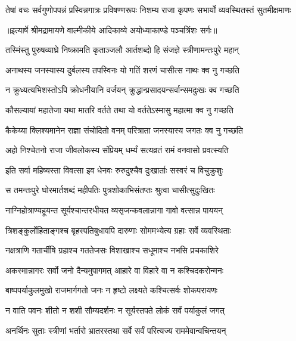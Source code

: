 \fourlineindentedshloka
{तेषां वचः सर्वगुणोपपन्नं}
{ प्रस्विन्नगात्रः प्रविषण्णरूपः}
{निशम्य राजा कृपणः सभार्यो}
{ व्यवस्थितस्तं सुतमीक्षमाणः} %


{॥इत्यार्षे श्रीमद्रामायणे वाल्मीकीये आदिकाव्ये अयोध्याकाण्डे पञ्चत्रिंशः सर्गः॥}


\twolineshloka
{तस्मिंस्तु पुरुषव्याघ्रे निष्क्रामति कृताञ्जलौ}
{आर्तशब्दो हि संजज्ञे स्त्रीणामन्तःपुरे महान्} %

\twolineshloka
{अनाथस्य जनस्यास्य दुर्बलस्य तपस्विनः}
{यो गतिं शरणं चासीत्स नाथः क्व नु गच्छति} %

\twolineshloka
{न क्रुध्यत्यभिशस्तोऽपि क्रोधनीयानि वर्जयन्}
{क्रुद्धान्प्रसादयन्सर्वान्समदुःखः क्व गच्छति} %

\twolineshloka
{कौसल्यायां महातेजा यथा मातरि वर्तते}
{तथा यो वर्ततेऽस्मासु महात्मा क्व नु गच्छति} %

\twolineshloka
{कैकेय्या क्लिश्यमानेन राज्ञा संचोदितो वनम्}
{परित्राता जनस्यास्य जगतः क्व नु गच्छति} %

\twolineshloka
{अहो निश्चेतनो राजा जीवलोकस्य संप्रियम्}
{धर्म्यं सत्यव्रतं रामं वनवासो प्रवत्स्यति} %

\twolineshloka
{इति सर्वा महिष्यस्ता विवत्सा इव धेनवः}
{रुरुदुश्चैव दुःखार्ताः सस्वरं च विचुक्रुशुः} %

\twolineshloka
{स तमन्तःपुरे घोरमार्तशब्दं महीपतिः}
{पुत्रशोकाभिसंतप्तः श्रुत्वा चासीत्सुदुःखितः} %

\twolineshloka
{नाग्निहोत्राण्यहूयन्त सूर्यश्चान्तरधीयत}
{व्यसृजन्कवलान्नागा गावो वत्सान्न पाययन्} %

\twolineshloka
{त्रिशङ्कुर्लोहिताङ्गश्च बृहस्पतिबुधावपि}
{दारुणाः सोममभ्येत्य ग्रहाः सर्वे व्यवस्थिताः} %

\twolineshloka
{नक्षत्राणि गतार्चींषि ग्रहाश्च गततेजसः}
{विशाखाश्च सधूमाश्च नभसि प्रचकाशिरे} %

\twolineshloka
{अकस्मान्नागरः सर्वो जनो दैन्यमुपागमत्}
{आहारे वा विहारे वा न कश्चिदकरोन्मनः} %

\twolineshloka
{बाष्पपर्याकुलमुखो राजमार्गगतो जनः}
{न हृष्टो लक्ष्यते कश्चित्सर्वः शोकपरायणः} %

\twolineshloka
{न वाति पवनः शीतो न शशी सौम्यदर्शनः}
{न सूर्यस्तपते लोकं सर्वं पर्याकुलं जगत्} %

\twolineshloka
{अनर्थिनः सुताः स्त्रीणां भर्तारो भ्रातरस्तथा}
{सर्वे सर्वं परित्यज्य राममेवान्वचिन्तयन्} %

